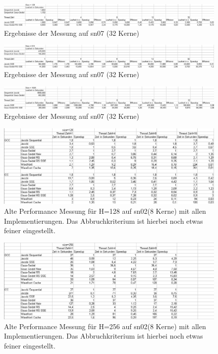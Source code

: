 \documentclass{article}
\begin{document}
\begin{figure}[h] 
  \centering
     \includegraphics[width=1.2\textwidth]{bilder/sn7129.png}
  \caption{Ergebnisse der Messung auf sn07 (32 Kerne)}
\end{figure}
\begin{figure}[h] 
  \centering
     \includegraphics[width=1.2\textwidth]{bilder/sn7513.png}
  \caption{Ergebnisse der Messung auf sn07 (32 Kerne)}
\end{figure}
\begin{figure}[h] 
  \centering
     \includegraphics[width=1.2\textwidth]{bilder/sn71025.png}
  \caption{Ergebnisse der Messung auf sn07 (32 Kerne)}
\end{figure}



\begin{figure}[h] 
  \centering
     \includegraphics[width=1.0\textwidth]{bilder/sn02128.png}
  \caption{Alte Performance Messung für H=128 auf sn02(8 Kerne) mit allen Implementierungen. Das Abbruchkriterium ist hierbei noch etwas feiner eingestellt.}
 
\end{figure}
\begin{figure}[h] 
  \centering
     \includegraphics[width=1.0\textwidth]{bilder/sn02256.png}
  \caption{Alte Performance Messung für H=256 auf sn02(8 Kerne) mit allen Implementierungen. Das Abbruchkriterium ist hierbei noch etwas feiner eingestellt.}
 
\end{figure}
\end{document}

